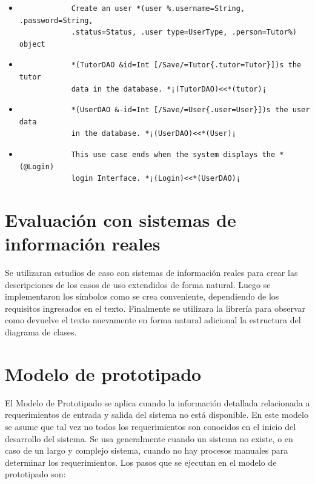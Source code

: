 \documentclass[12pt, openany, xcolor=table]{book}
\begin{document}
	\begin{itemize}
		\item \begin{verbatim}
			Create an user *(user %.username=String, .password=String,
			.status=Status, .user type=UserType, .person=Tutor%) object
		\end{verbatim}
		
		\item \begin{verbatim}
			*(TutorDAO &id=Int [/Save/=Tutor{.tutor=Tutor}])s the tutor 
			data in the database. *¡(TutorDAO)<<*(tutor)¡
		\end{verbatim}
	
		\item \begin{verbatim}
			*(UserDAO &-id=Int [/Save/=User{.user=User}])s the user data 
			in the database. *¡(UserDAO)<<*(User)¡
		\end{verbatim}
	
		\item \begin{verbatim}
			This use case ends when the system displays the *(@Login) 
			login Interface. *¡(Login)<<*(UserDAO)¡
		\end{verbatim}
		
	\end{itemize}
	
	\section{Evaluación con sistemas de información reales}
	
	Se utilizaran estudios de caso con sistemas de información reales para crear las descripciones de los casos de uso extendidos de forma natural. Luego se implementaron los símbolos como se crea conveniente, dependiendo de los requisitos ingresados en el texto. Finalmente se utilizara la librería para observar como devuelve el texto nuevamente en forma natural adicional la estructura del diagrama de clases.
	
	\section{Modelo de prototipado}
	El Modelo de Prototipado se aplica cuando la información detallada relacionada a requerimientos de entrada y salida del sistema no está disponible. En este modelo se asume que tal vez no todos los requerimientos son conocidos en el inicio del desarrollo del sistema. Se usa generalmente cuando un sistema no existe, o en caso de un largo y complejo sistema, cuando no hay procesos manuales para determinar los requerimientos. Los pasos que se ejecutan en el modelo de prototipado son: 
	
\end{document}
